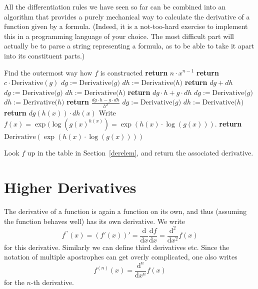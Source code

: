 All the differentiation rules we have seen so far can be combined into an
algorithm that provides a purely mechanical way to calculate the derivative
of a function given by a formula. (Indeed, it is a not-too-hard exercise to
implement this in a programming language of your choice. The most difficult
part will actually be to parse a string representing a formula, as to be able
to take it apart into its constituent parts.)

\begin{algorithmic}[5] 
\State Find the outermost way how $f$ is constructed
\State {}
\State \textbf{return} $n\cdot x^{n-1}$
\State \textbf{return} $c\cdot \mbox{Derivative}(g)$
\State
{}
\State $dg:=\mbox{Derivative($g$)}$
\State $dh:=\mbox{Derivative($h$)}$
\State \textbf{return} $dg+dh$ 
\State $dg:=\mbox{Derivative($g$)}$
\State $dh:=\mbox{Derivative($h$)}$
\State \textbf{return} $dg\cdot h+g\cdot dh$
\State $dg:=\mbox{Derivative($g$)}$
\State $dh:=\mbox{Derivative($h$)}$
\State \textbf{return} $\frac{dg\cdot h-g\cdot dh}{h^2}$
\State $dg:=\mbox{Derivative($g$)}$
\State $dh:=\mbox{Derivative($h$)}$
\State \textbf{return} $dg(h(x))\cdot dh(x)$
\State
Write $f(x)=\exp(\log(g(x)^{h(x)})=\exp(h(x)\cdot\log(g(x)))$.
\State \textbf{return} $\mbox{Derivative}(\exp(h(x)\cdot\log(g(x))))$

\Else
  \State Look $f$ up in the table in Section~\ref{derelem}, and return the associated derivative.
\EndIf
\EndProcedure
\end{algorithmic}

\section{Higher Derivatives}

The derivative of a function is again a function on its own, and thus
(assuming the function behaves well) has
its own derivative. We write
\[
f^{\prime\prime}(x)=(f'(x))'
=\frac{\mbox{d}}{\mbox{d}x}\frac{\mbox{d}f}{\mbox{d}x}
=\frac{\mbox{d}^2}{\mbox{d}x^2}f(x)
\]
for this derivative. Similarly we can define third derivatives etc. Since
the notation of multiple apostrophes can get overly complicated, one also writes
\[
f^{(n)}(x)=
\frac{\mbox{d}^n}{\mbox{d}x^n}f(x)
\]
for the $n$-th derivative.

